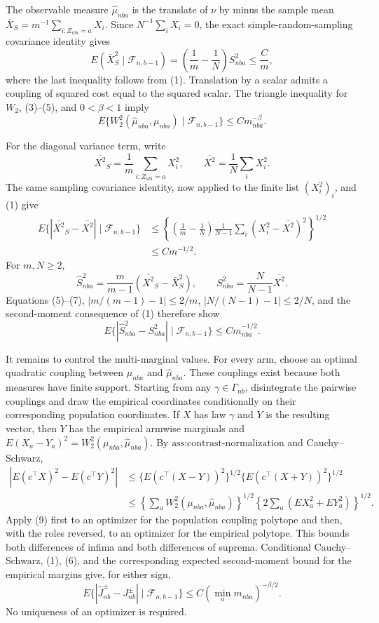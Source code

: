 The observable measure \(\widehat\mu_{nba}\) is the translate of \(\nu\) by minus the sample mean \(\bar X_S=m^{-1}\sum_{i:Z_{nbi}=a}X_i\). Since \(N^{-1}\sum_iX_i=0\), the exact simple-random-sampling covariance identity gives
\[
E(\bar X_S^2\mid\mathcal F_{n,b-1})
=\left(\frac1m-\frac1N\right)S_{nba}^2\le\frac{C}{m},
\tag{5}
\]
where the last inequality follows from (1). Translation by a scalar admits a coupling of squared cost equal to the squared scalar. The triangle inequality for \(W_2\), (3)--(5), and \(0<\beta<1\) imply
\[
E\{W_2^2(\widehat\mu_{nba},\mu_{nba})\mid\mathcal F_{n,b-1}\}
\le C m_{nba}^{-\beta}.
\tag{6}
\]

For the diagonal variance term, write
\[
\overline{X^2}_S=\frac1m\sum_{i:Z_{nbi}=a}X_i^2,
\qquad
\overline{X^2}=\frac1N\sum_iX_i^2.
\]
The same sampling covariance identity, now applied to the finite list \((X_i^2)_i\), and (1) give
\[
\begin{aligned}
E\{|\overline{X^2}_S-\overline{X^2}|\mid\mathcal F_{n,b-1}\}
&\le\left\{\left(\frac1m-\frac1N\right)
\frac1{N-1}\sum_i(X_i^2-\overline{X^2})^2\right\}^{1/2}\\
&\le C m^{-1/2}.
\end{aligned}
\tag{7}
\]
For \(m,N\ge2\),
\[
\widehat S_{nba}^2=\frac{m}{m-1}(\overline{X^2}_S-\bar X_S^2),
\qquad
S_{nba}^2=\frac{N}{N-1}\overline{X^2}.
\]
Equations (5)--(7), \(|m/(m-1)-1|\le2/m\), \(|N/(N-1)-1|\le2/N\), and the second-moment consequence of (1) therefore show
\[
E\{|\widehat S_{nba}^2-S_{nba}^2|\mid\mathcal F_{n,b-1}\}
\le C m_{nba}^{-1/2}.
\tag{8}
\]

It remains to control the multi-marginal values. For every arm, choose an optimal quadratic coupling between \(\mu_{nba}\) and \(\widehat\mu_{nba}\). These couplings exist because both measures have finite support. Starting from any \(\gamma\in\Gamma_{nb}\), disintegrate the pairwise couplings and draw the empirical coordinates conditionally on their corresponding population coordinates. If \(X\) has law \(\gamma\) and \(Y\) is the resulting vector, then \(Y\) has the empirical armwise marginals and
\(E(X_a-Y_a)^2=W_2^2(\mu_{nba},\widehat\mu_{nba})\). By \(\text{ass:contrast-normalization}\) and Cauchy--Schwarz,
\[
\begin{aligned}
|E(c^\top X)^2-E(c^\top Y)^2|
&\le\{E(c^\top(X-Y))^2\}^{1/2}
\{E(c^\top(X+Y))^2\}^{1/2}\\
&\le\left\{\sum_aW_2^2(\mu_{nba},\widehat\mu_{nba})\right\}^{1/2}
\left\{2\sum_a(EX_a^2+EY_a^2)\right\}^{1/2}.
\end{aligned}
\tag{9}
\]
Apply (9) first to an optimizer for the population coupling polytope and then, with the roles reversed, to an optimizer for the empirical polytope. This bounds both differences of infima and both differences of suprema. Conditional Cauchy--Schwarz, (1), (6), and the corresponding expected second-moment bound for the empirical margins give, for either sign,
\[
E\{|\widehat J_{nb}^{\pm}-J_{nb}^{\pm}|\mid\mathcal F_{n,b-1}\}
\le C\left(\min_a m_{nba}\right)^{-\beta/2}.
\tag{10}
\]
No uniqueness of an optimizer is required.

